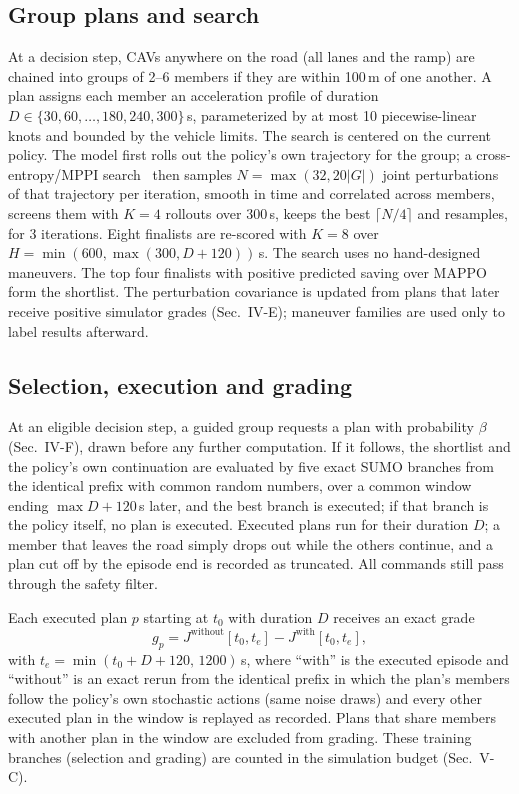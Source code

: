 \documentclass[conference]{IEEEtran}
\begin{document}
\subsection{Group plans and search}
At a decision step, CAVs anywhere on the road (all lanes and the ramp) are chained into groups of 2--6 members if they are within 100\,m of one another. %
A plan assigns each member an acceleration profile of duration $D\in\{30,60,\dots,180,240,300\}$\,s, parameterized by at most 10 piecewise-linear knots and bounded by the vehicle limits. %
The search is centered on the current policy. The model first rolls out the policy's own trajectory for the group; a cross-entropy/MPPI search~\cite{williams_mppi2017} then samples $N=\max(32, 20|G|)$ joint perturbations of that trajectory per iteration, smooth in time and correlated across members, screens them with $K=4$ rollouts over 300\,s, keeps the best $\lceil N/4\rceil$ and resamples, for 3 iterations. Eight finalists are re-scored with $K=8$ over $H=\min(600,\max(300,D+120))$\,s. The search uses no hand-designed maneuvers. The top four finalists with positive predicted saving over MAPPO form the shortlist. %
The perturbation covariance is updated from plans that later receive positive simulator grades (Sec.~IV-E); maneuver families are used only to label results afterward.

\subsection{Selection, execution and grading}
At an eligible decision step, a guided group requests a plan with probability $\beta$ (Sec.~IV-F), drawn before any further computation. If it follows, the shortlist and the policy's own continuation are evaluated by five exact SUMO branches from the identical prefix with common random numbers, over a common window ending $\max D+120$\,s later, and the best branch is executed; if that branch is the policy itself, no plan is executed. %
Executed plans run for their duration $D$; a member that leaves the road simply drops out while the others continue, and a plan cut off by the episode end is recorded as truncated. All commands still pass through the safety filter. %

Each executed plan $p$ starting at $t_0$ with duration $D$ receives an exact grade
\begin{equation}
g_p = J^{\text{without}}[t_0,t_e] - J^{\text{with}}[t_0,t_e],
\end{equation}
with $t_e=\min(t_0+D+120,\,1200)$\,s,
where ``with'' is the executed episode and ``without'' is an exact rerun from the identical prefix in which the plan's members follow the policy's own stochastic actions (same noise draws) and every other executed plan in the window is replayed as recorded. Plans that share members with another plan in the window are excluded from grading. %
These training branches (selection and grading) are counted in the simulation budget (Sec.~V-C).
\end{document}
